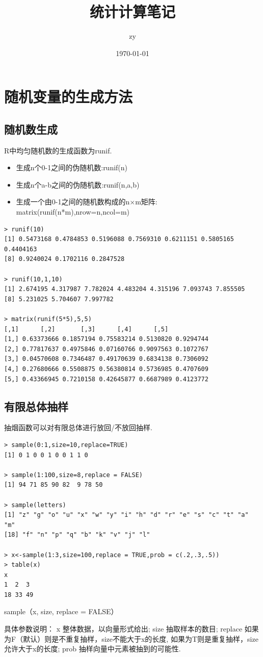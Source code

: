 \documentclass[11pt,a4paper,oneside]{book}
\title{\huge 统计计算笔记}
\author{zy}
\date{\today}
\begin{document}
\maketitle
\tableofcontents  %


\chapter{随机变量的生成方法}
\section{随机数生成}
R中均匀随机数的生成函数为runif.
\begin{itemize}
	\item 生成n个0-1之间的伪随机数:runif(n)
	\item 生成n个a-b之间的伪随机数:runif(n,a,b)
	\item 生成一个由0-1之间的随机数构成的n$\times$m矩阵:
	matrix(runif(n*m),nrow=n,ncol=m)
\end{itemize}

\begin{lstlisting}
> runif(10)
[1] 0.5473168 0.4784853 0.5196088 0.7569310 0.6211151 0.5805165 0.4404163
[8] 0.9240024 0.1702116 0.2847528

> runif(10,1,10)
[1] 2.674195 4.317987 7.782024 4.483204 4.315196 7.093743 7.855505
[8] 5.231025 5.704607 7.997782

> matrix(runif(5*5),5,5)
[,1]      [,2]       [,3]      [,4]      [,5]
[1,] 0.63373666 0.1857194 0.75583214 0.5130820 0.9294744
[2,] 0.77817637 0.4975846 0.07160766 0.9097563 0.1072767
[3,] 0.04570608 0.7346487 0.49170639 0.6834138 0.7306092
[4,] 0.27680666 0.5508875 0.56380814 0.5736985 0.4707609
[5,] 0.43366945 0.7210158 0.42645877 0.6687989 0.4123772
\end{lstlisting}
\section{有限总体抽样}
抽烟函数可以对有限总体进行放回/不放回抽样.
\begin{lstlisting}
> sample(0:1,size=10,replace=TRUE)
[1] 0 1 0 0 1 0 0 1 1 0

> sample(1:100,size=8,replace = FALSE)
[1] 94 71 85 90 82  9 78 50

> sample(letters)
[1] "z" "g" "o" "u" "x" "w" "y" "i" "h" "d" "r" "e" "s" "c" "t" "a" "m"
[18] "f" "n" "p" "q" "b" "k" "v" "j" "l"

> x<-sample(1:3,size=100,replace = TRUE,prob = c(.2,.3,.5))
> table(x)
x
1  2  3 
18 33 49 
\end{lstlisting}
\begin{tcolorbox}[colback=blue!7!white,colframe=blue!40]
sample（x, size, replace = FALSE）

具体参数说明：
x 整体数据，以向量形式给出;
size 抽取样本的数目;
replace 如果为F（默认）则是不重复抽样，size不能大于x的长度,
如果为T则是重复抽样，size允许大于x的长度;
prob 抽样向量中元素被抽到的可能性.
\end{tcolorbox}
\end{document}
